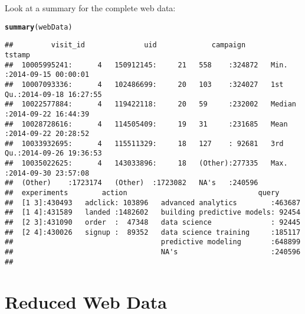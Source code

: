 \documentclass{article}\usepackage[]{graphicx}\usepackage[]{color}
\makeatletter
\newcommand{\hlstd}[1]{\textcolor[rgb]{0.345,0.345,0.345}{#1}}%
\newcommand{\hlkwd}[1]{\textcolor[rgb]{0.737,0.353,0.396}{\textbf{#1}}}%
\newenvironment{kframe}{%
 \def\at@end@of@kframe{}%
 \ifinner\ifhmode%
  \def\at@end@of@kframe{\end{minipage}}%
  \begin{minipage}{\columnwidth}%
 \fi\fi%
 \def\FrameCommand##1{\hskip\@totalleftmargin \hskip-\fboxsep
 \colorbox{shadecolor}{##1}\hskip-\fboxsep
     \hskip-\linewidth \hskip-\@totalleftmargin \hskip\columnwidth}%
 \MakeFramed {\advance\hsize-\width
   \@totalleftmargin\z@ \linewidth\hsize
   \@setminipage}}%
 {\par\unskip\endMakeFramed%
 \at@end@of@kframe}
\newenvironment{knitrout}{}{} %
\makeatother
\begin{document}
Look at a summary for the complete web data:
\begin{knitrout}
\color{fgcolor}\begin{kframe}
\begin{alltt}
\hlkwd{summary}\hlstd{(webData)}
\end{alltt}
\begin{verbatim}
##         visit_id              uid             campaign          tstamp                   
##  10005995241:      4   150912145:     21   558    :324872   Min.   :2014-09-15 00:00:01  
##  10007093336:      4   102486699:     20   103    :324027   1st Qu.:2014-09-18 16:27:55  
##  10022577884:      4   119422118:     20   59     :232002   Median :2014-09-22 16:44:39  
##  10028728616:      4   114505409:     19   31     :231685   Mean   :2014-09-22 20:28:52  
##  10033932695:      4   115511329:     18   127    : 92681   3rd Qu.:2014-09-26 19:36:53  
##  10035022625:      4   143033896:     18   (Other):277335   Max.   :2014-09-30 23:57:08  
##  (Other)    :1723174   (Other)  :1723082   NA's   :240596                                
##  experiments        action                               query       
##  [1 3]:430493   adclick: 103896   advanced analytics        :463687  
##  [1 4]:431589   landed :1482602   building predictive models: 92454  
##  [2 3]:431090   order  :  47348   data science              : 92445  
##  [2 4]:430026   signup :  89352   data science training     :185117  
##                                   predictive modeling       :648899  
##                                   NA's                      :240596  
## 
\end{verbatim}
\end{kframe}
\end{knitrout}

\section{Reduced Web Data}
\end{document}
